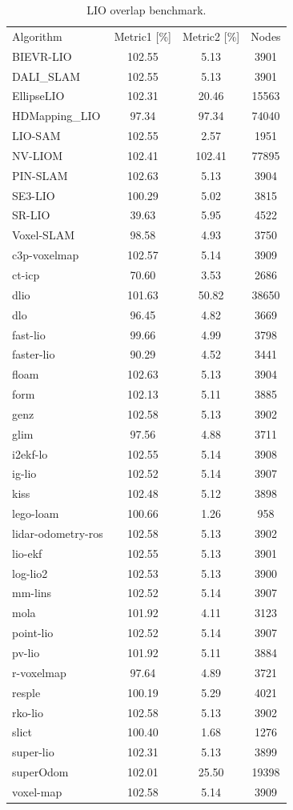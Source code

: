 \begin{table}[]
\centering
\begin{tabular}{lccc}
\rowcolor[HTML]{C0C0C0}
Algorithm & Metric1 [\%] & Metric2 [\%] & Nodes \\
BIEVR-LIO & 102.55 & 5.13 & 3901 \\
DALI_SLAM & 102.55 & 5.13 & 3901 \\
EllipseLIO & 102.31 & 20.46 & 15563 \\
HDMapping_LIO & 97.34 & 97.34 & 74040 \\
LIO-SAM & 102.55 & 2.57 & 1951 \\
NV-LIOM & 102.41 & 102.41 & 77895 \\
PIN-SLAM & 102.63 & 5.13 & 3904 \\
SE3-LIO & 100.29 & 5.02 & 3815 \\
SR-LIO & 39.63 & 5.95 & 4522 \\
Voxel-SLAM & 98.58 & 4.93 & 3750 \\
c3p-voxelmap & 102.57 & 5.14 & 3909 \\
ct-icp & 70.60 & 3.53 & 2686 \\
dlio & 101.63 & 50.82 & 38650 \\
dlo & 96.45 & 4.82 & 3669 \\
fast-lio & 99.66 & 4.99 & 3798 \\
faster-lio & 90.29 & 4.52 & 3441 \\
floam & 102.63 & 5.13 & 3904 \\
form & 102.13 & 5.11 & 3885 \\
genz & 102.58 & 5.13 & 3902 \\
glim & 97.56 & 4.88 & 3711 \\
i2ekf-lo & 102.55 & 5.14 & 3908 \\
ig-lio & 102.52 & 5.14 & 3907 \\
kiss & 102.48 & 5.12 & 3898 \\
lego-loam & 100.66 & 1.26 & 958 \\
lidar-odometry-ros & 102.58 & 5.13 & 3902 \\
lio-ekf & 102.55 & 5.13 & 3901 \\
log-lio2 & 102.53 & 5.13 & 3900 \\
mm-lins & 102.52 & 5.14 & 3907 \\
mola & 101.92 & 4.11 & 3123 \\
point-lio & 102.52 & 5.14 & 3907 \\
pv-lio & 101.92 & 5.11 & 3884 \\
r-voxelmap & 97.64 & 4.89 & 3721 \\
resple & 100.19 & 5.29 & 4021 \\
rko-lio & 102.58 & 5.13 & 3902 \\
slict & 100.40 & 1.68 & 1276 \\
super-lio & 102.31 & 5.13 & 3899 \\
superOdom & 102.01 & 25.50 & 19398 \\
voxel-map & 102.58 & 5.14 & 3909 \\
\end{tabular}
\caption{LIO overlap benchmark.}
\label{tab:lio_overlap}
\end{table}